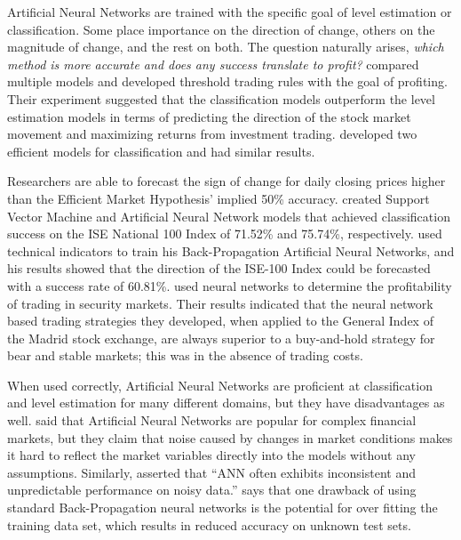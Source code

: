 Artificial Neural Networks are trained with the specific goal of level estimation or classification.
Some place importance on the direction of change, others on the magnitude of change, and the rest on both.
The question naturally arises, \textit{which method is more accurate and does any success translate to profit?}
\citet{Leung:2000} compared multiple models and developed threshold trading rules with the goal of profiting.
Their experiment suggested that the classification models outperform the level estimation models in terms of predicting the direction of the stock market movement and maximizing returns from investment trading.
\citet{Kara:2011} developed two efficient models for classification and had similar results.

Researchers are able to forecast the sign of change for daily closing prices higher than the Efficient Market Hypothesis' implied 50\% accuracy.
\citet{Kara:2011} created Support Vector Machine and Artificial Neural Network models that achieved classification success on the ISE National 100 Index of 71.52\% and 75.74\%, respectively.
\citet{Diler:2003} used technical indicators to train his Back-Propagation Artificial Neural Networks, and his results showed that the direction of the ISE-100 Index could be forecasted with a success rate of 60.81\%.
\citet{Fernandez:2000} used neural networks to determine the profitability of trading in security markets.
Their results indicated that the neural network based trading strategies they developed, when applied to the General Index of the Madrid stock exchange, are always superior to a buy-and-hold strategy for bear and stable markets; this was in the absence of trading costs.

When used correctly, Artificial Neural Networks are proficient at classification and level estimation for many different domains, but they have disadvantages as well.
\citet{Guresen:2008} said that Artificial Neural Networks are popular for complex financial markets, but they claim that noise caused by changes in market conditions makes it hard to reflect the market variables directly into the models without any assumptions.
Similarly, \citet{Kim:2003} asserted that ``ANN often exhibits inconsistent and unpredictable performance on noisy data.''
\citet{Ticknor:2013} says that one drawback of using standard Back-Propagation neural networks is the potential for over fitting the training data set, which results in reduced accuracy on unknown test sets.

